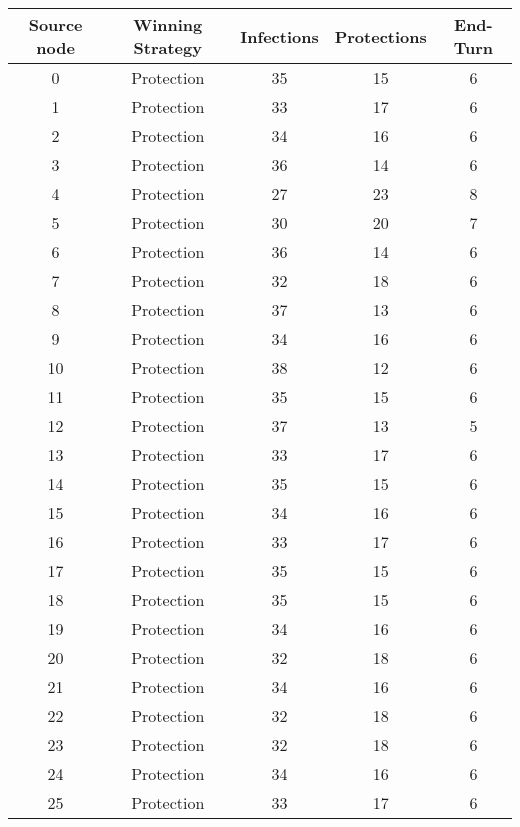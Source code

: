 \documentclass[results.tex]{subfiles}
\begin{document}
\begin{center}
  \begin{tabular}{| c || c | c | c | c |}
    \hline
    {\bfseries Source node} & {\bfseries Winning Strategy} & {\bfseries Infections} & {\bfseries Protections} & {\bfseries End-Turn} \\  %
    \hline\hline
    0 & Protection & 35 & 15 & 6 \\ 
    \hline
    1 & Protection & 33 & 17 & 6 \\ 
    \hline
    2 & Protection & 34 & 16 & 6 \\ 
    \hline
    3 & Protection & 36 & 14 & 6 \\ 
    \hline
    4 & Protection & 27 & 23 & 8 \\ 
    \hline
    5 & Protection & 30 & 20 & 7 \\ 
    \hline
    6 & Protection & 36 & 14 & 6 \\ 
    \hline
    7 & Protection & 32 & 18 & 6 \\ 
    \hline
    8 & Protection & 37 & 13 & 6 \\ 
    \hline
    9 & Protection & 34 & 16 & 6 \\ 
    \hline
    10 & Protection & 38 & 12 & 6 \\ 
    \hline
    11 & Protection & 35 & 15 & 6 \\ 
    \hline
    12 & Protection & 37 & 13 & 5 \\ 
    \hline
    13 & Protection & 33 & 17 & 6 \\ 
    \hline
    14 & Protection & 35 & 15 & 6 \\ 
    \hline
    15 & Protection & 34 & 16 & 6 \\ 
    \hline
    16 & Protection & 33 & 17 & 6 \\ 
    \hline
    17 & Protection & 35 & 15 & 6 \\ 
    \hline
    18 & Protection & 35 & 15 & 6 \\ 
    \hline
    19 & Protection & 34 & 16 & 6 \\ 
    \hline
    20 & Protection & 32 & 18 & 6 \\ 
    \hline
    21 & Protection & 34 & 16 & 6 \\ 
    \hline
    22 & Protection & 32 & 18 & 6 \\ 
    \hline
    23 & Protection & 32 & 18 & 6 \\ 
    \hline
    24 & Protection & 34 & 16 & 6 \\ 
    \hline
    25 & Protection & 33 & 17 & 6 \\ 

\end{tabular}
\end{center}
\end{document}
